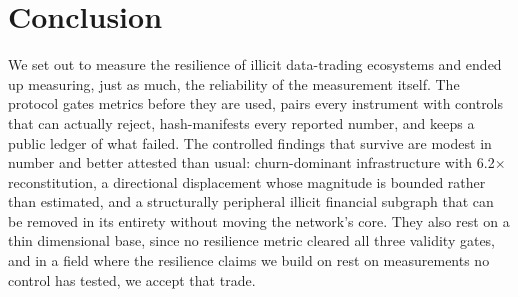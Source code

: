 \section{Conclusion}

We set out to measure the resilience of illicit data-trading ecosystems and
ended up measuring, just as much, the reliability of the measurement itself.
The protocol gates metrics before they are used, pairs every instrument with
controls that can actually reject, hash-manifests every reported number, and
keeps a public ledger of what failed. The controlled findings that survive are
modest in number and better attested than usual: churn-dominant infrastructure
with 6.2$\times$ reconstitution, a directional displacement whose magnitude is
bounded rather than estimated, and a structurally peripheral illicit financial
subgraph that can be removed in its entirety without moving the network's core.
They also rest on a thin dimensional base, since no resilience metric cleared
all three validity gates, and in a field where the resilience claims we build on
rest on measurements no control has tested, we accept that trade.
